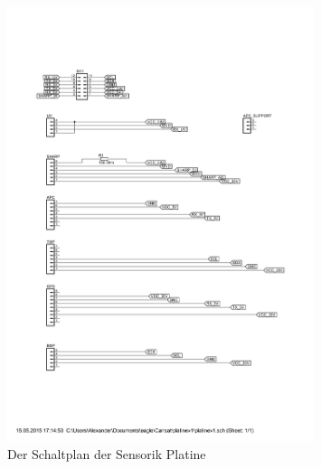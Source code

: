 \begin{figure}[H]
	\centering
	\includegraphics[trim = 60mm 100mm 55mm 100mm, clip, width=0.8\textwidth]{8_Anhang/Schaltplanv1.png}
	\caption{Der Schaltplan der Sensorik Platine}
	\label{pic_schaltplan}
\end{figure}

\newpage

